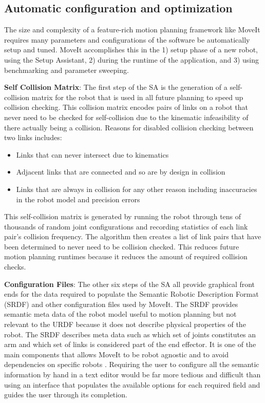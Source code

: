\documentclass[10pt,journal,compsoc]{joser1}
\begin{document}
{%
\subsection{Automatic configuration and optimization}

The size and complexity of a feature-rich motion planning framework like MoveIt requires many parameters and configurations of the software be automatically setup and tuned. MoveIt accomplishes this in the 1) setup phase of a new robot, using the Setup Assistant, 2) during the runtime of the application, and 3) using benchmarking and parameter sweeping.

{\bf Self Collision Matrix}: The first step of the SA is the generation of a self-collision matrix for the robot that is used in all future planning to speed up collision checking. This collision matrix encodes pairs of links on a robot that never need to be checked for self-collision due to the kinematic infeasibility of there actually being a collision. Reasons for disabled collision checking between two links includes:
 
\begin{itemize}
    \item Links that can never intersect due to kinematics
    \item Adjacent links that are connected and so are by design in collision
    \item Links that are always in collision for any other reason including inaccuracies in the robot model and precision errors
\end{itemize}

This self-collision matrix is generated by running the robot through tens of thousands of random joint configurations and recording statistics of each link pair's collision frequency. The algorithm then creates a list of link pairs that have been determined to never need to be collision checked. This reduces future motion planning runtimes because it reduces the amount of required collision checks.

{\bf Configuration Files}: The other six steps of the SA all provide graphical front ends for the data required to populate the Semantic Robotic Description Format (SRDF) and other configuration files used by MoveIt. The SRDF provides semantic meta data of the robot model useful to motion planning but not relevant to the URDF because it does not describe physical properties of the robot. The SRDF describes meta data such as which set of joints constitutes an arm and which set of links is considered part of the end effector. It is one of the main components that allows MoveIt to be robot agnostic and to avoid dependencies on specific robots \cite{moveit}. Requiring the user to configure all the semantic information by hand in a text editor would be far more tedious and difficult than using an interface that populates the available options for each required field and guides the user through its completion.

}
\end{document}

